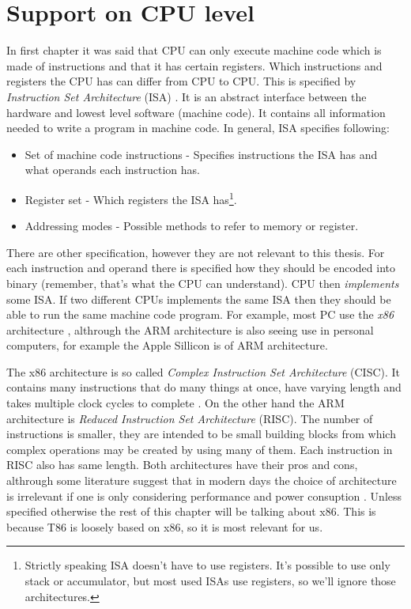\section{Support on CPU level}
In first chapter it was said that CPU can only execute machine code which is made of instructions
and that it has certain registers. Which instructions and registers the CPU has can differ from CPU to CPU.
This is specified by \textit{Instruction Set Architecture} (ISA) \cite{aps-isa}. It is an abstract interface between
the hardware and lowest level software (machine code). It contains all information needed to write a program in machine
code. In general, ISA specifies following:
\begin{itemize}
    \item Set of machine code instructions - Specifies instructions the ISA has and what operands each instruction has.
    \item Register set - Which registers the ISA has\footnote{Strictly speaking ISA doesn't have to use registers. It's possible to use only stack or accumulator, but most used ISAs use registers, so we'll ignore those architectures. }.
    \item Addressing modes - Possible methods to refer to memory or register.
\end{itemize}
There are other specification, however they are not relevant to this thesis. For each instruction and operand there is
specified how they should be encoded into binary (remember, that's what the CPU can understand).
CPU then \textit{implements} some ISA. If two different CPUs implements the same ISA then they should be able to run the same machine code program.
For example, most PC use the \textit{x86} architecture \cite{aps-isa}, althrough the ARM architecture is also seeing use in personal computers, for example the Apple Sillicon is of ARM architecture.

The x86 architecture is so called \textit{Complex Instruction Set Architecture} (CISC).
It contains many instructions that do many things at once, have varying length and takes multiple clock cycles to complete \cite{intel-manual}.
On the other hand the ARM architecture is \textit{Reduced Instruction Set Architecture} (RISC).
The number of instructions is smaller, they are intended to be small building blocks from which complex operations may be created by using many of them. Each instruction in RISC also has same length. Both architectures have their pros and cons, althrough some literature suggest that in modern days the choice of architecture is irrelevant if one is only considering performance and power consuption  \cite{riscvscisc1, riscvscisc2}. Unless specified otherwise the rest of this chapter will be talking about x86. This is because T86  is loosely based on x86, so it is most relevant for us.

